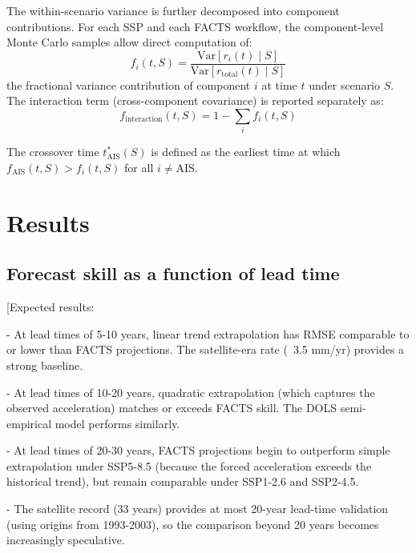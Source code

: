 \documentclass[11pt]{article}
\begin{document}
The within-scenario variance is further decomposed into component contributions.  For each SSP and each FACTS workflow, the component-level Monte Carlo samples allow direct computation of:
\begin{equation}
  f_i(t, S) = \frac{\text{Var}[r_i(t) \mid S]}{\text{Var}[r_{\text{total}}(t) \mid S]}
  \label{eq:variance-fraction}
\end{equation}
the fractional variance contribution of component $i$ at time $t$ under scenario $S$.  The interaction term (cross-component covariance) is reported separately as:
\begin{equation}
  f_{\text{interaction}}(t, S) = 1 - \sum_i f_i(t, S)
  \label{eq:interaction}
\end{equation}

The crossover time $t^*_{\text{AIS}}(S)$ is defined as the earliest time at which $f_{\text{AIS}}(t, S) > f_i(t, S)$ for all $i \neq \text{AIS}$.


\section{Results}
\label{sec:results}

\subsection{Forecast skill as a function of lead time}
\label{sec:skill}

[Expected results:

- At lead times of 5-10 years, linear trend extrapolation has RMSE comparable to or lower than FACTS projections. The satellite-era rate (~3.5 mm/yr) provides a strong baseline.

- At lead times of 10-20 years, quadratic extrapolation (which captures the observed acceleration) matches or exceeds FACTS skill. The DOLS semi-empirical model performs similarly.

- At lead times of 20-30 years, FACTS projections begin to outperform simple extrapolation under SSP5-8.5 (because the forced acceleration exceeds the historical trend), but remain comparable under SSP1-2.6 and SSP2-4.5.

- The satellite record (33 years) provides at most 20-year lead-time validation (using origins from 1993-2003), so the comparison beyond 20 years becomes increasingly speculative.
\end{document}

